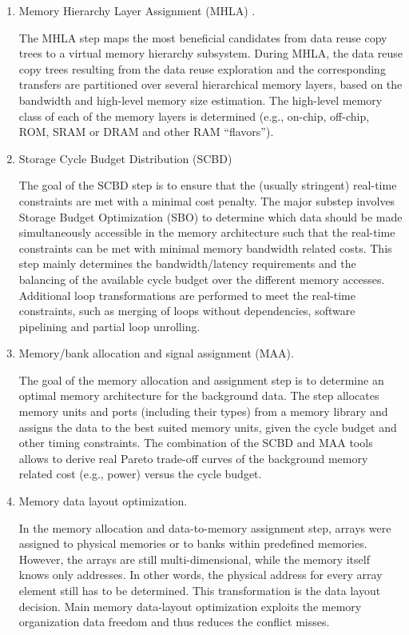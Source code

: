 \begin{enumerate}

\item Memory Hierarchy Layer Assignment (MHLA) .

The MHLA step maps the most beneficial candidates from data reuse copy trees to a virtual memory hierarchy subsystem. 
During MHLA, the data reuse copy trees resulting from the data reuse exploration and the corresponding transfers are partitioned over several hierarchical memory layers, based on the bandwidth and high-level memory size estimation. 
The high-level memory class of each of the memory layers is determined (e.g., on-chip, off-chip, ROM, SRAM or DRAM and other RAM “flavors”). 


\item Storage Cycle Budget Distribution (SCBD) 

The goal of the SCBD step is to ensure that the (usually stringent) real-time constraints are met with a minimal cost penalty. 
The major substep involves Storage Budget Optimization (SBO) to determine which data should be made simultaneously accessible in the memory architecture such that the real-time constraints can be met with minimal memory bandwidth related costs.
This step mainly determines the bandwidth/latency requirements and the balancing of the available cycle budget over the different memory accesses.
Additional loop transformations are performed to meet the real-time constraints, such as merging of loops without dependencies, software pipelining and partial loop unrolling. 

\item Memory/bank allocation and signal assignment (MAA).

The goal of the memory allocation and assignment step is to determine an optimal memory architecture for the background data. 
The step allocates memory units and ports (including their types) from a memory library and assigns the data to the best suited memory units, given the cycle budget and other timing constraints. 
The combination of the SCBD and MAA tools allows to derive real Pareto trade-off curves of the background memory related cost (e.g., power) versus the cycle budget.

\item Memory data layout optimization.

In the memory allocation and data-to-memory assignment step, arrays were assigned to physical memories or to banks within predefined memories. 
However, the arrays are still multi-dimensional, while the memory itself knows only addresses. 
In other words, the physical address for every array element still has to be determined. 
This transformation is the data layout decision.
 Main memory data-layout optimization exploits the memory organization data freedom and thus reduces the conflict misses.

\end{enumerate}

